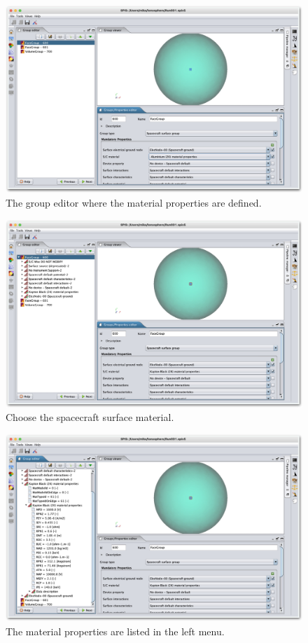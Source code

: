 \documentclass[a4paper, 12pt]{article}
\begin{document}
\begin{figure}[!ht]
    \centering
    \includegraphics[width=1\textwidth]{fig11.jpg}
    \caption{The group editor where the material properties are defined.}
     \label{11}
\end{figure}

\begin{figure}[!ht]
    \centering
    \includegraphics[width=1\textwidth]{fig12.jpg}
    \caption{Choose the spacecraft surface material.}
    \label{12}
\end{figure}

\begin{figure}[!ht]
    \centering
    \includegraphics[width=1\textwidth]{fig13.jpg}
    \caption{The material properties are listed in the left menu.}
    \label{13}
\end{figure}
\end{document}
